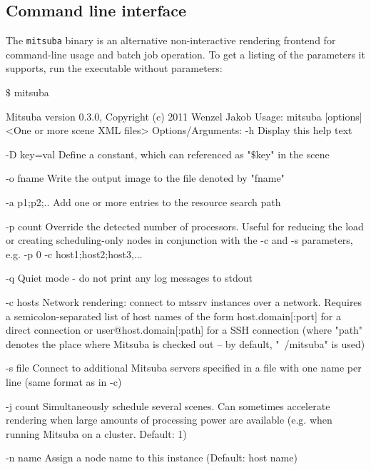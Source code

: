 \subsection{Command line interface}
\label{sec:mitsuba}
The \texttt{mitsuba} binary is an alternative non-interactive rendering 
frontend for command-line usage and batch job operation.
To get a listing of the parameters it supports, run
the executable without parameters:
\begin{shell}
$\texttt{\$}$ mitsuba 
\end{shell}
\begin{console}[label=lst:mitsuba-cli,caption=Command line options of the \texttt{mitsuba} binary]
Mitsuba version 0.3.0, Copyright (c) 2011 Wenzel Jakob
Usage: mitsuba [options] <One or more scene XML files>
Options/Arguments:
   -h          Display this help text

   -D key=val  Define a constant, which can referenced as "$\$$key" in the scene

   -o fname    Write the output image to the file denoted by "fname"

   -a p1;p2;.. Add one or more entries to the resource search path

   -p count    Override the detected number of processors. Useful for reducing
               the load or creating scheduling-only nodes in conjunction with
               the -c and -s parameters, e.g. -p 0 -c host1;host2;host3,...

   -q          Quiet mode - do not print any log messages to stdout

   -c hosts    Network rendering: connect to mtssrv instances over a network.
               Requires a semicolon-separated list of host names of the form
                       host.domain[:port] for a direct connection
                 or
                       user@host.domain[:path] for a SSH connection (where
                       "path" denotes the place where Mitsuba is checked
                       out -- by default, "~/mitsuba" is used)

   -s file     Connect to additional Mitsuba servers specified in a file
               with one name per line (same format as in -c)

   -j count    Simultaneously schedule several scenes. Can sometimes accelerate
               rendering when large amounts of processing power are available
               (e.g. when running Mitsuba on a cluster. Default: 1)

   -n name     Assign a node name to this instance (Default: host name)


\end{console}
